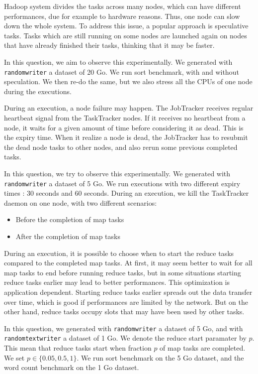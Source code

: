 

Hadoop system divides the tasks across many nodes, which can have different performances, due for example to hardware reasons.
Thus, one node can slow down the whole system.
To address this issue, a popular approach is speculative tasks.
Tasks which are still running on some nodes are launched again on nodes that have already finished their tasks, thinking that it may be faster.

In this question, we aim to observe this experimentally.
We generated with \texttt{randomwriter} a dataset of 20 Go.
We run sort benchmark, with and without speculation.
We then re-do the same, but we also stress all the CPUs of one node during the executions.



During an execution, a node failure may happen.
The JobTracker receives regular heartbeat signal from the TaskTracker nodes.
If it receives no heartbeat from a node, it waits for a given amount of time before considering it as dead.
This is the expiry time.
When it realize a node is dead, the JobTracker has to resubmit the dead node tasks to other nodes,
and also rerun some previous completed tasks.

In this question, we try to observe this experimentally.
We generated with \texttt{randomwriter} a dataset of 5 Go.
We run executions with two different expiry times : 30 seconds and 60 seconds.
During an execution, we kill the TaskTracker daemon on one node, with two different scenarios:
\begin{itemize}
    \item Before the completion of map tasks
    \item After the completion of map tasks
\end{itemize}



During an execution, it is possible to choose when to start the reduce tasks compared to the completed map tasks.
At first, it may seem better to wait for all map tasks to end before running reduce tasks,
but in some situations starting reduce tasks earlier may lead to better performances.
This optimization is application dependent.
Starting reduce tasks earlier spreads out the data transfer over time, which is good if performances are limited by the network.
But on the other hand, reduce tasks occupy slots that may have been used by other tasks.

In this question, we generated with \texttt{randomwriter} a dataset of 5 Go, and with \texttt{randomtextwriter} a dataset of 1 Go.
We denote the reduce start paramater by $p$.
This mean that reduce tasks start when fraction $p$ of map tasks are completed.
We set $p \in \lbrace 0.05, 0.5, 1 \rbrace$.
We run sort benchmark on the 5 Go dataset, and the word count benchmark on the 1 Go dataset.

